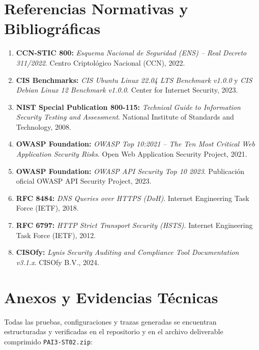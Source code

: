 \documentclass[11pt,a4paper]{article}
\begin{document}
\section{Referencias Normativas y Bibliográficas}

\begin{enumerate}[leftmargin=1.5em]
    \item \textbf{CCN-STIC 800:} \textit{Esquema Nacional de Seguridad (ENS) -- Real Decreto 311/2022}. Centro Criptológico Nacional (CCN), 2022.
    \item \textbf{CIS Benchmarks:} \textit{CIS Ubuntu Linux 22.04 LTS Benchmark v1.0.0} y \textit{CIS Debian Linux 12 Benchmark v1.0.0}. Center for Internet Security, 2023.
    \item \textbf{NIST Special Publication 800-115:} \textit{Technical Guide to Information Security Testing and Assessment}. National Institute of Standards and Technology, 2008.
    \item \textbf{OWASP Foundation:} \textit{OWASP Top 10:2021 -- The Ten Most Critical Web Application Security Risks}. Open Web Application Security Project, 2021.
    \item \textbf{OWASP Foundation:} \textit{OWASP API Security Top 10 2023}. Publicación oficial OWASP API Security Project, 2023.
    \item \textbf{RFC 8484:} \textit{DNS Queries over HTTPS (DoH)}. Internet Engineering Task Force (IETF), 2018.
    \item \textbf{RFC 6797:} \textit{HTTP Strict Transport Security (HSTS)}. Internet Engineering Task Force (IETF), 2012.
    \item \textbf{CISOfy:} \textit{Lynis Security Auditing and Compliance Tool Documentation v3.1.x}. CISOfy B.V., 2024.
\end{enumerate}

\section{Anexos y Evidencias Técnicas}

Todas las pruebas, configuraciones y trazas generadas se encuentran estructuradas y verificadas en el repositorio y en el archivo deliverable comprimido \texttt{PAI3-ST02.zip}:
\end{document}
